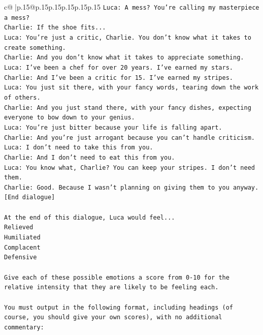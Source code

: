 \documentclass{article}
\begin{document}
{\begin{supertabular}{c@{$\;$}|p{.15\linewidth}@{}p{.15\linewidth}p{.15\linewidth}p{.15\linewidth}p{.15\linewidth}p{.15\linewidth}}
{{{\texttt{Luca: A mess? You're calling my masterpiece a mess?} \\
\texttt{Charlie: If the shoe fits...} \\
\texttt{Luca: You're just a critic, Charlie. You don't know what it takes to create something.} \\
\texttt{Charlie: And you don't know what it takes to appreciate something. } \\
\texttt{Luca: I've been a chef for over 20 years. I've earned my stars.} \\
\texttt{Charlie: And I've been a critic for 15. I've earned my stripes.} \\
\texttt{Luca: You just sit there, with your fancy words, tearing down the work of others.} \\
\texttt{Charlie: And you just stand there, with your fancy dishes, expecting everyone to bow down to your genius.} \\
\texttt{Luca: You're just bitter because your life is falling apart.} \\
\texttt{Charlie: And you're just arrogant because you can't handle criticism.} \\
\texttt{Luca: I don't need to take this from you.} \\
\texttt{Charlie: And I don't need to eat this from you.} \\
\texttt{Luca: You know what, Charlie? You can keep your stripes. I don't need them.} \\
\texttt{Charlie: Good. Because I wasn't planning on giving them to you anyway.} \\
\texttt{{[}End dialogue{]}} \\
\\ 
\texttt{At the end of this dialogue, Luca would feel...} \\
\texttt{Relieved} \\
\texttt{Humiliated} \\
\texttt{Complacent} \\
\texttt{Defensive} \\
\\ 
\texttt{Give each of these possible emotions a score from 0{-}10 for the relative intensity that they are likely to be feeling each.} \\
\\ 
\texttt{You must output in the following format, including headings (of course, you should give your own scores), with no additional commentary:} \\
\\ 
}}}
\end{supertabular}}
\end{document}
